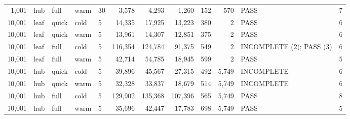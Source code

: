 \begin{table}[h!]
\begin{tabular}{rllllrrrrrlr}
1{,}001 & hub & full & warm & 30 & 3{,}578 & 4{,}293 & 1{,}260 & 152 & 570 & PASS & 7 \\
10{,}001 & leaf & quick & cold & 5 & 14{,}335 & 17{,}925 & 13{,}223 & 380 & 2 & PASS & 6 \\
10{,}001 & leaf & quick & warm & 5 & 13{,}961 & 14{,}307 & 12{,}851 & 375 & 2 & PASS & 6 \\
10{,}001 & leaf & full & cold & 5 & 116{,}354 & 124{,}784 & 91{,}375 & 549 & 2 & INCOMPLETE (2); PASS (3) & 6 \\
10{,}001 & leaf & full & warm & 5 & 42{,}714 & 54{,}785 & 18{,}945 & 599 & 2 & PASS & 5 \\
10{,}001 & hub & quick & cold & 5 & 39{,}896 & 45{,}567 & 27{,}315 & 492 & 5{,}749 & INCOMPLETE & 6 \\
10{,}001 & hub & quick & warm & 5 & 32{,}328 & 33{,}837 & 18{,}679 & 514 & 5{,}749 & INCOMPLETE & 6 \\
10{,}001 & hub & full & cold & 5 & 129{,}902 & 135{,}368 & 107{,}396 & 565 & 5{,}749 & PASS & 8 \\
10{,}001 & hub & full & warm & 5 & 35{,}696 & 42{,}447 & 17{,}783 & 698 & 5{,}749 & PASS & 5 \\
\bottomrule
\end{tabular}
\end{table}
